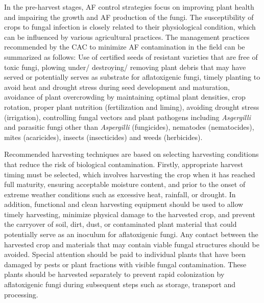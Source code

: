 In the pre-harvest stages, AF control strategies focus on improving plant health and impairing the growth and AF production of the fungi. The susceptibility of crops to fungal infection is closely related to their physiological condition, which can be influenced by various agricultural practices. The management practices recommended by the CAC to minimize AF contamination in the field can be summarized as follows: Use of certified seeds of resistant varieties that are free of toxic fungi, plowing under/ destroying/ removing plant debris that may have served or potentially serves as substrate for aflatoxigenic fungi, timely planting to avoid heat and drought stress during seed development and maturation, avoidance of plant overcrowding by maintaining optimal plant densities, crop rotation, proper plant nutrition (fertilization and liming), avoiding drought stress (irrigation), controlling fungal vectors and plant pathogens including \textit{Asgergilli} and parasitic fungi other than \textit{Aspergilli} (fungicides), nematodes (nematocides), mites (acaricides), insects (insecticides) and weeds (herbicides). 


Recommended harvesting techniques are based on selecting harvesting conditions that reduce the risk of biological contamination. Firstly, appropriate harvest timing must be selected, which involves harvesting the crop when it has reached full maturity, ensuring acceptable moisture content, and prior to the onset of extreme weather conditions such as excessive heat, rainfall, or drought. In addition, functional and clean harvesting equipment should be used to allow timely harvesting, minimize physical damage to the harvested crop, and prevent the carryover of soil, dirt, dust, or contaminated plant material that could potentially serve as an inoculum for aflatoxigenic fungi. Any contact between the harvested crop and materials that may contain viable fungal structures should be avoided. Special attention should be paid to individual plants that have been damaged by pests or plant fractions with visible fungal contamination. These plants should be harvested separately to prevent rapid colonization by aflatoxigenic fungi during subsequent steps such as storage, transport and processing.


